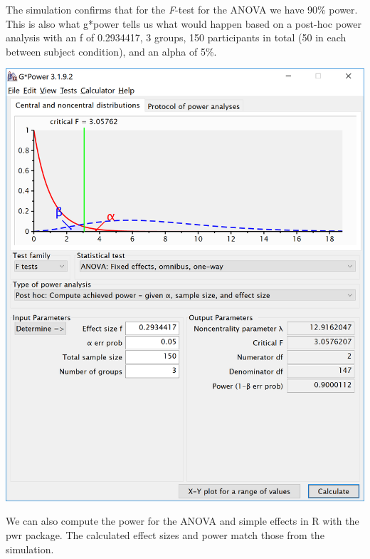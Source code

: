 \documentclass[]{book}
\newenvironment{Shaded}{\begin{snugshade}}{\end{snugshade}}
\newcommand{\DataTypeTok}[1]{\textcolor[rgb]{0.13,0.29,0.53}{#1}}
\newcommand{\DecValTok}[1]{\textcolor[rgb]{0.00,0.00,0.81}{#1}}
\newcommand{\FloatTok}[1]{\textcolor[rgb]{0.00,0.00,0.81}{#1}}
\newcommand{\KeywordTok}[1]{\textcolor[rgb]{0.13,0.29,0.53}{\textbf{#1}}}
\newcommand{\NormalTok}[1]{#1}
\newcommand{\OperatorTok}[1]{\textcolor[rgb]{0.81,0.36,0.00}{\textbf{#1}}}
\newcommand{\StringTok}[1]{\textcolor[rgb]{0.31,0.60,0.02}{#1}}
\begin{document}
The simulation confirms that for the \emph{F}-test for the ANOVA we have 90\% power. This is also what g*power tells us what would happen based on a post-hoc power analysis with an f of 0.2934417, 3 groups, 150 participants in total (50 in each between subject condition), and an alpha of 5\%.

\includegraphics{screenshots/gpower_7.png}

We can also compute the power for the ANOVA and simple effects in R with the pwr package. The calculated effect sizes and power match those from the simulation.

\begin{Shaded}
\end{Shaded}
\end{document}
